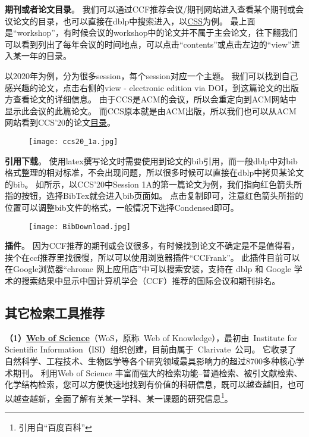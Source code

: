 \documentclass[lang=cn,11pt,a4paper]{elegantpaper}
\begin{document}
\textbf{期刊或者论文目录}。
我们可以通过CCF推荐会议/期刊网站进入查看某个期刊或会议论文的目录，也可以直接在dblp中搜索进入，以\href{https://dblp.uni-trier.de/db/conf/ccs/index.html}{CSS}为例。
最上面是“workshop”，有时候会议的workshop中的论文并不属于主会论文，往下翻我们可以看到列出了每年会议的时间地点，可以点击“contents”或点击左边的“view”进入某一年的目录。

以2020年为例，分为很多session，每个session对应一个主题。
我们可以找到自己感兴趣的论文，点击右侧的view - electronic edition via DOI，到这篇论文的出版方查看论文的详细信息。
由于CCS是ACM的会议，所以会重定向到ACM网站中显示此会议的此篇论文。
而CCS原本就是由ACM出版，所以我们也可以从ACM网站看到CCS'20的论文\href{https://dl.acm.org/doi/proceedings/10.1145/3320269}{目录}。

\begin{figure}[!htb]
\centering
\texttt{[image: ccs20\_1a.jpg]}
\caption{}
\label{fig.ccs20_1a}
\end{figure}
\textbf{引用下载}。
使用latex撰写论文时需要使用到论文的bib引用，而一般dblp中对bib格式整理的相对标准，不会出现问题，所以很多时候可以直接在dblp中拷贝某论文的bib。
如所示，以CCS'20中Session 1A的第一篇论文为例，我们指向红色箭头所指的按钮，选择BibTex就会进入bib页面如。
点击复制即可，注意红色箭头所指的位置可以调整bib文件的格式，一般情况下选择Condensed即可。
\begin{figure}[!htb]
\centering
\texttt{[image: BibDownload.jpg]}
\caption{}
\label{fig.ccs20_bib}
\end{figure}

\textbf{插件}。
因为CCF推荐的期刊或会议很多，有时候找到论文不确定是不是值得看，挨个在ccf推荐里找很慢，所以可以使用浏览器插件“CCFrank”。
此插件目前可以在Google浏览器“chrome 网上应用店”中可以搜索安装，支持在 dblp 和 Google 学术的搜索结果中显示中国计算机学会（CCF）推荐的国际会议和期刊排名。

\subsection{其它检索工具推荐}
\textbf{（1）\href{https://www.webofscience.com/wos/alldb/basic-search}{Web of Science}}（WoS，原称~Web of Knowledge），最初由~Institute for Scientific Information（ISI）组织创建，目前由属于~Clarivate~公司。
它收录了自然科学、工程技术、生物医学等各个研究领域最具影响力的超过8700多种核心学术期刊。
利用Web of Science 丰富而强大的检索功能--普通检索、被引文献检索、化学结构检索，您可以方便快速地找到有价值的科研信息，既可以越查越旧，也可以越查越新，全面了解有关某一学科、某一课题的研究信息\footnote{引用自“百度百科”}。
\end{document}
